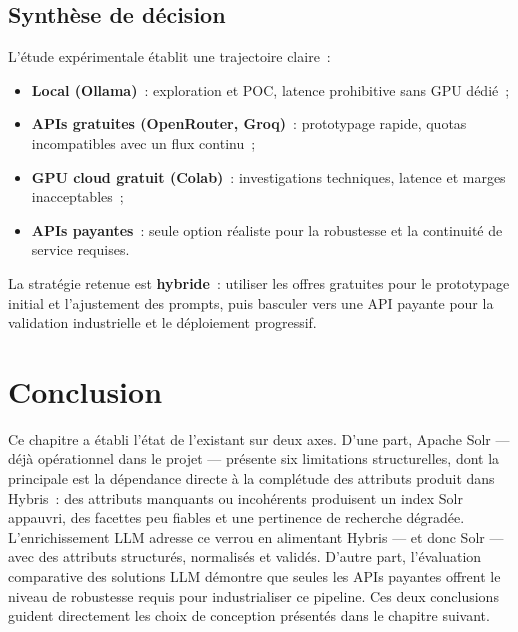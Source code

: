 \subsection{Synthèse de décision}
L'étude expérimentale établit une trajectoire claire~:

\begin{itemize}
  \item \textbf{Local (Ollama)}~: exploration et POC, latence prohibitive sans GPU dédié~;
  \item \textbf{APIs gratuites (OpenRouter, Groq)}~: prototypage rapide, quotas incompatibles avec un flux continu~;
  \item \textbf{GPU cloud gratuit (Colab)}~: investigations techniques, latence et marges inacceptables~;
  \item \textbf{APIs payantes}~: seule option réaliste pour la robustesse et la continuité de service requises.
\end{itemize}

La stratégie retenue est \textbf{hybride}~: utiliser les offres gratuites pour le prototypage initial et l'ajustement des prompts, puis basculer vers une API payante pour la validation industrielle et le déploiement progressif.

\section{Conclusion}
Ce chapitre a établi l'état de l'existant sur deux axes. D'une part, Apache Solr — déjà opérationnel dans le projet — présente six limitations structurelles, dont la principale est la dépendance directe à la complétude des attributs produit dans Hybris~: des attributs manquants ou incohérents produisent un index Solr appauvri, des facettes peu fiables et une pertinence de recherche dégradée. L'enrichissement LLM adresse ce verrou en alimentant Hybris — et donc Solr — avec des attributs structurés, normalisés et validés. D'autre part, l'évaluation comparative des solutions LLM démontre que seules les APIs payantes offrent le niveau de robustesse requis pour industrialiser ce pipeline. Ces deux conclusions guident directement les choix de conception présentés dans le chapitre suivant.